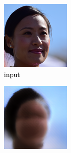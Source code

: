 \documentclass{article}
\begin{document}
\begin{figure}[h!]
    \caption{Dataset Face}
     \centering
     \begin{subfigure}[b]{0.24\textwidth}
         \centering
         \includegraphics[width=\textwidth]{illustration/face_input.png}
         \caption{input}
     \end{subfigure}
     \begin{subfigure}[b]{0.24\textwidth}
         \centering
         \includegraphics[width=\textwidth]{illustration/face_biggan_500.png}

\end{subfigure}
\end{figure}
\end{document}
